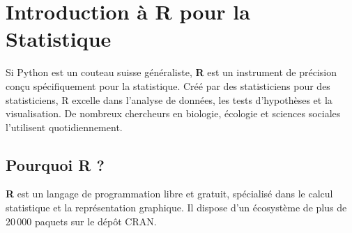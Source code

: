 \chapter{Introduction \`a R pour la Statistique}
\label{ch:r_intro}

\begin{intuition}
Si Python est un couteau suisse g\'en\'eraliste, \textbf{R} est un
instrument de pr\'ecision con\c{c}u sp\'ecifiquement pour la statistique. Cr\'e\'e par des
statisticiens pour des statisticiens, R excelle dans l'analyse de donn\'ees, les tests
d'hypoth\`eses et la visualisation. De nombreux chercheurs en biologie, \'ecologie et
sciences sociales l'utilisent quotidiennement.
\end{intuition}

\section{Pourquoi R ?}

\begin{definition}[Le langage R]
\textbf{R} est un langage de programmation libre et gratuit, sp\'ecialis\'e dans le calcul
statistique et la repr\'esentation graphique. Il dispose d'un \'ecosyst\`eme de plus de
20\,000 paquets sur le d\'ep\^ot CRAN.
\end{definition}

\begin{center}
\end{center}

